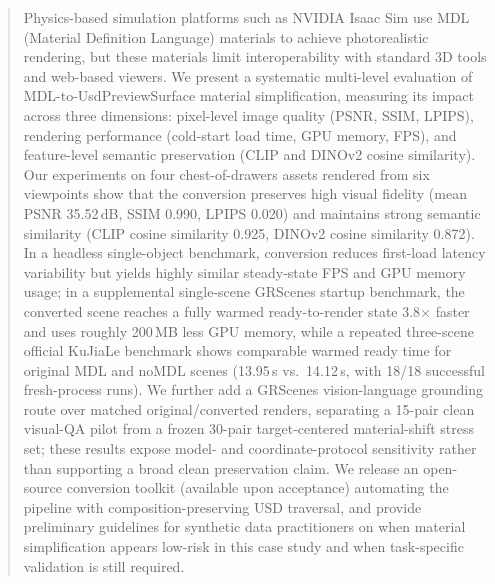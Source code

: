 \begin{abstract}
Physics-based simulation platforms such as NVIDIA Isaac Sim use MDL (Material
Definition Language) materials to achieve photorealistic rendering, but these
materials limit interoperability with standard 3D tools and web-based viewers.
We present a systematic multi-level evaluation of MDL-to-UsdPreviewSurface material
simplification, measuring its impact across three dimensions: pixel-level image
quality (PSNR, SSIM, LPIPS), rendering performance (cold-start load time, GPU memory, FPS),
and feature-level semantic preservation (CLIP and DINOv2 cosine similarity). Our
experiments on four chest-of-drawers assets rendered from six viewpoints show
that the conversion preserves high visual fidelity (mean PSNR 35.52\,dB, SSIM
0.990, LPIPS 0.020) and maintains strong semantic similarity (CLIP cosine
similarity 0.925, DINOv2 cosine similarity 0.872). In a headless single-object benchmark, conversion reduces
first-load latency variability but yields highly similar steady-state FPS and
GPU memory usage; in a supplemental single-scene GRScenes startup benchmark, the
converted scene reaches a fully warmed ready-to-render state 3.8$\times$
faster and uses roughly 200\,MB less GPU memory, while a repeated three-scene
official KuJiaLe benchmark shows comparable warmed ready time for original MDL
and noMDL scenes (13.95\,s vs.\ 14.12\,s, with 18/18 successful fresh-process
runs). We
further add a GRScenes vision-language grounding route over matched
original/converted renders, separating a 15-pair clean visual-QA pilot from a
frozen 30-pair target-centered material-shift stress set; these results expose
model- and coordinate-protocol sensitivity rather than supporting a broad clean
preservation claim.
We
release an open-source conversion toolkit (available upon acceptance) automating the pipeline with
composition-preserving USD traversal, and provide preliminary guidelines for
synthetic data practitioners on when material simplification appears low-risk in this case study
and when task-specific validation is still required.
\end{abstract}
